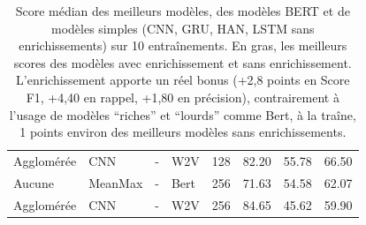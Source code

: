 \begin{table}[ht]
{\begin{tabular}{lllll|rrr}
Agglomérée  & CNN      & -              & W2V        & 128            & 82.20          & 55.78          & 66.50          \\
Aucune      & MeanMax  & -              & Bert       & 256            & 71.63          & 54.58          & 62.07          \\
Agglomérée  & CNN      & -              & W2V        & 256            & 84.65          & 45.62          & 59.90          \\ \hline
\end{tabular}%
}
\caption{Score médian des meilleurs modèles, des modèles BERT et de modèles simples (CNN, GRU, HAN, LSTM sans enrichissements) sur 10 entraînements. En gras, les meilleurs scores des modèles avec enrichissement et sans enrichissement. L'enrichissement apporte un réel bonus (+2,8 points en Score F1, +4,40 en rappel, +1,80 en précision), contrairement à l'usage de modèles \enquote{riches} et \enquote{lourds} comme Bert, à la traîne, 1 points environ des meilleurs modèles sans enrichissements.}
\label{tab:chap4:general-results}
\end{table}

